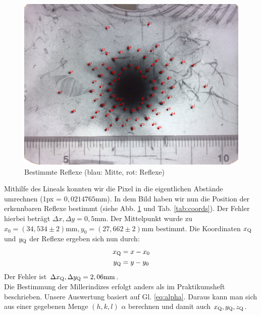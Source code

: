 \begin{figure}
\centering
\includegraphics[scale=0.6]{data/laue/draw/laue_before.png}
\caption{Bestimmte Reflexe (blau: Mitte, rot: Reflexe)}
\label{fig:laue_points}
\end{figure}

Mithilfe des Lineals konnten wir die Pixel in die eigentlichen Abstände umrechnen (1px = $0,0214765\si{\milli\meter}$). In dem Bild haben wir nun die Position der erkennbaren Reflexe bestimmt (siehe Abb. \ref{fig:laue_points} und Tab. \ref{tab:coords}). Der Fehler hierbei beträgt $\Delta x, \Delta y = 0,5 \si{\milli\meter}$. Der Mittelpunkt wurde zu $x_0 = (34,534 \pm 2)\si{\milli\meter}, y_0 = (27,662 \pm 2)\si{\milli\meter}$ bestimmt. Die Koordinaten $x\ind{Q}$ und $y\ind{Q}$ der Reflexe ergeben sich nun durch:
\begin{align*}
x\ind{Q} &= x - x_0\\
y\ind{Q} &= y - y_0
\end{align*}
Der Fehler ist $\Delta x\ind{Q}, \Delta y\ind{Q} = \si{2,06 \milli\meter}$.\\
Die Bestimmung der Millerindizes erfolgt anders als im Praktikumsheft beschrieben. Unsere Auswertung basiert auf Gl. \ref{eq:alpha}. Daraus kann man sich aus einer gegebenen Menge $(h,k,l)$ $\alpha$ berechnen und damit auch $x\ind{Q},y\ind{Q},z\ind{Q}$.\\ 

